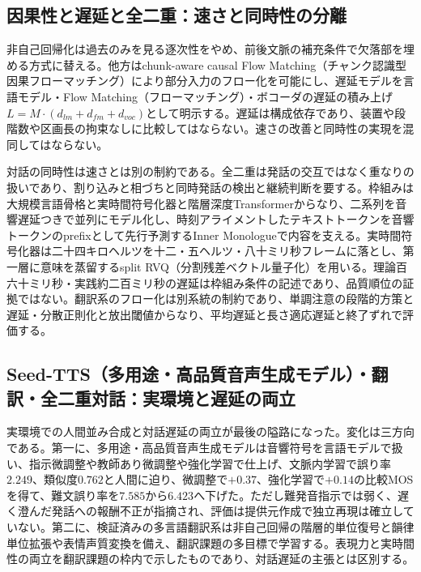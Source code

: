 \documentclass[lualatex,a4paper,10pt]{jlreq}
\begin{document}
\subsection{因果性と遅延と全二重：速さと同時性の分離}
非自己回帰化は過去のみを見る逐次性をやめ、前後文脈の補充条件で欠落部を埋める方式に替える\autocite{btd060}。他方はchunk-aware causal Flow Matching（チャンク認識型因果フローマッチング）により部分入力のフロー化を可能にし、遅延モデルを言語モデル・Flow Matching（フローマッチング）・ボコーダの遅延の積み上げ$L=M\cdot(d_{lm}+d_{fm}+d_{voc})$として明示する\autocite{btd133}。遅延は構成依存であり、装置や段階数や区画長の拘束なしに比較してはならない\autocite{btd132,btd133}。速さの改善と同時性の実現を混同してはならない\autocite{btd062,btd134}。

対話の同時性は速さとは別の制約である。全二重は発話の交互ではなく重なりの扱いであり、割り込みと相づちと同時発話の検出と継続判断を要する\autocite{btd134}。枠組みは大規模言語骨格と実時間符号化器と階層深度Transformerからなり、二系列を音響遅延つきで並列にモデル化し、時刻アライメントしたテキストトークンを音響トークンのprefixとして先行予測するInner Monologueで内容を支える\autocite{btd134}。実時間符号化器は二十四キロヘルツを十二・五ヘルツ・八十ミリ秒フレームに落とし、第一層に意味を蒸留するsplit RVQ（分割残差ベクトル量子化）を用いる\autocite{btd134}。理論百六十ミリ秒・実践約二百ミリ秒の遅延は枠組み条件の記述であり、品質順位の証拠ではない\autocite{btd134}。翻訳系のフロー化は別系統の制約であり、単調注意の段階的方策と遅延・分散正則化と放出閾値からなり、平均遅延と長さ適応遅延と終了ずれで評価する\autocite{btd062}。

\subsection{Seed-TTS（多用途・高品質音声生成モデル）・翻訳・全二重対話：実環境と遅延の両立}
実環境での人間並み合成と対話遅延の両立が最後の隘路になった\autocite{btd061,btd062,btd134}。変化は三方向である。第一に、多用途・高品質音声生成モデルは音響符号を言語モデルで扱い、指示微調整や教師あり微調整や強化学習で仕上げ、文脈内学習で誤り率$2.249$、類似度$0.762$と人間に迫り、微調整で$+0.37$、強化学習で$+0.14$の比較MOSを得て、難文誤り率を$7.585$から$6.423$へ下げた\autocite{btd061}。ただし難発音指示では弱く、遅く澄んだ発話への報酬不正が指摘され、評価は提供元作成で独立再現は確立していない\autocite{btd061}。第二に、検証済みの多言語翻訳系は非自己回帰の階層的単位復号と韻律単位拡張や表情声質変換を備え、翻訳課題の多目標で学習する\autocite{btd062}。表現力と実時間性の両立を翻訳課題の枠内で示したものであり、対話遅延の主張とは区別する\autocite{btd062}。
\end{document}

